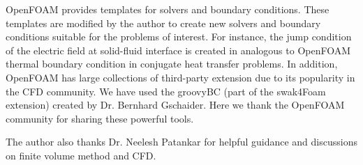 OpenFOAM provides templates for solvers and boundary conditions. These templates are modified by the author to create new solvers and boundary conditions suitable for the problems of interest. For instance, the jump condition of the electric field at solid-fluid interface is created in analogous to OpenFOAM thermal boundary condition in conjugate heat transfer problems. In addition, OpenFOAM has large collections of third-party extension due to its popularity in the CFD community. We have used the \textsf{groovyBC} (part of the \textsf{swak4Foam} extension) created by Dr. Bernhard Gschaider. Here we thank the OpenFOAM community for sharing these powerful tools. 

The author also thanks Dr. Neelesh Patankar for helpful guidance and discussions on finite volume method and CFD.
